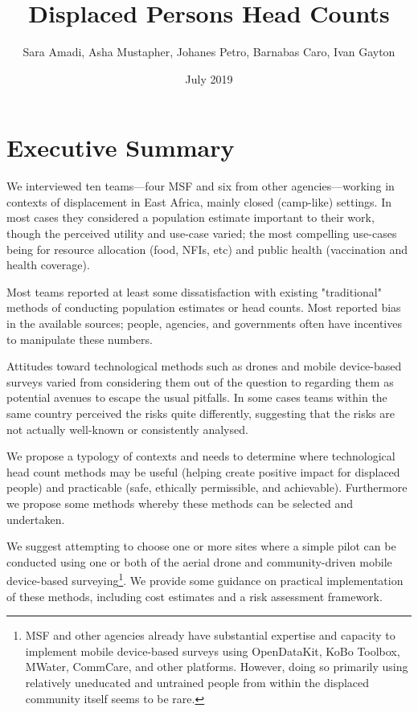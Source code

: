 \documentclass[a4paper,12pt,twoside]{article}
\title{Displaced Persons Head Counts}
\author{Sara Amadi, Asha Mustapher, Johanes Petro, Barnabas Caro, Ivan Gayton }
\date{July 2019}
\begin{document}
\maketitle


\renewcommand{\baselinestretch}{1.5}\normalsize %
\tableofcontents
\renewcommand{\baselinestretch}{1.0}\normalsize

\newpage

\section{Executive Summary}
\begin{multicols}{2}
We interviewed ten teams---four MSF and six from other agencies---working in contexts of displacement in East Africa, mainly closed (camp-like) settings. In most cases they considered a population estimate important to their work, though the perceived utility and use-case varied; the most compelling use-cases being for resource allocation (food, NFIs, etc) and public health (vaccination and health coverage). 

Most teams reported at least some dissatisfaction with existing "traditional" methods of conducting population estimates or head counts. Most reported bias in the available sources; people, agencies, and governments often have incentives to manipulate these numbers. 

Attitudes toward technological methods such as drones and mobile device-based surveys varied from considering them out of the question to regarding them as potential avenues to escape the usual pitfalls. In some cases teams within the same country perceived the risks quite differently, suggesting that the risks are not actually well-known or consistently analysed. 

We propose a typology of contexts and needs to determine where technological head count methods may be useful (helping create positive impact for displaced people) and practicable (safe, ethically permissible, and achievable). Furthermore we propose some methods whereby these methods can be selected and undertaken.

We suggest attempting to choose one or more sites where a simple pilot can be conducted using one or both of the aerial drone and community-driven mobile device-based surveying\footnote{MSF and other agencies already have substantial expertise and capacity to implement mobile device-based surveys using OpenDataKit, KoBo Toolbox, MWater, CommCare, and other platforms. However, doing so primarily using relatively uneducated and untrained people from within the displaced community itself seems to be rare.}. We provide some guidance on practical implementation of these methods, including cost estimates and a risk assessment framework.

\end{multicols}
\end{document}
